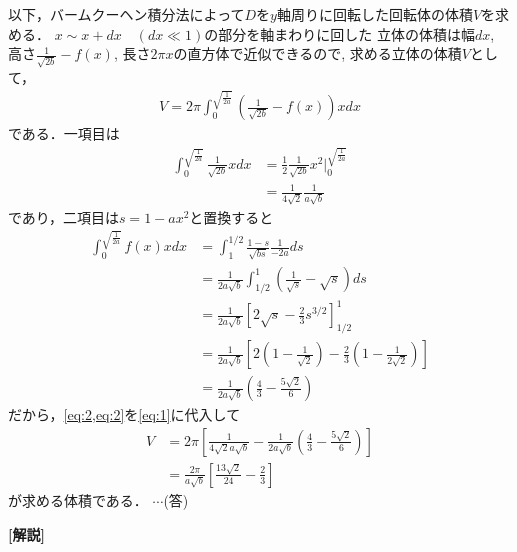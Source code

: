 \documentclass[a4paper,10pt]{ltjsarticle}
\begin{document}
\begin{multicols}{2}
  以下，バームクーヘン積分法によって$D$を$y$軸周りに回転した回転体の体積$V$を求める．
  $x \sim x+dx \quad (dx \ll 1)$の部分を軸まわりに回した
  立体の体積は幅$dx$, 高さ$\frac{1}{\sqrt{2b}}-f(x)$, 長さ$2\pi x$の直方体で近似できるので,
  求める立体の体積$V$として，
  \begin{align}
    V = 2\pi \int_{0}^{\sqrt{\frac{1}{2a}}} \left(\frac{1}{\sqrt{2b}} - f(x)\right)x dx \label{eq:1}
  \end{align}
  である．一項目は
  \begin{align}
    \int_{0}^{\sqrt{\frac{1}{2a}}} \frac{1}{\sqrt{2b}} x dx
     & = \frac{1}{2} \frac{1}{\sqrt{2b}} x^2 \Big|_{0}^{\sqrt{\frac{1}{2a}}} \nonumber \\
     & = \frac{1}{4\sqrt{2}} \frac{1}{a\sqrt{b}} \label{eq:2}
  \end{align}
  であり，二項目は$s=1-ax^2$と置換すると
  \begin{align}
    \int_{0}^{\sqrt{\frac{1}{2a}}} f(x)x dx
     & = \int_{1}^{1/2} \frac{1-s}{\sqrt{bs}} \frac{1}{-2a} ds                        \nonumber       \\
     & = \frac{1}{2a\sqrt{b}} \int_{1/2}^{1} \left(\frac{1}{\sqrt{s}} - \sqrt{s}\right) ds  \nonumber \\
     & = \frac{1}{2a\sqrt{b}} \left[2\sqrt{s} - \frac{2}{3} s^{3/2}\right]_{1/2}^{1}     \nonumber    \\
     & = \frac{1}{2a\sqrt{b}} \left[2\left(1-\frac{1}{\sqrt{2}}\right) -
    \frac{2}{3}\left(1-\frac{1}{2\sqrt{2}}\right)\right]                               \nonumber      \\
     & = \frac{1}{2a\sqrt{b}} \left(\frac{4}{3} - \frac{5\sqrt{2}}{6}\right) \label{eq:3}
  \end{align}
  だから，\cref{eq:2,eq:2}を\cref{eq:1}に代入して
  \begin{align*}
    V & = 2\pi \left[ \frac{1}{4\sqrt{2}a\sqrt{b}}  - \frac{1}{2a\sqrt{b}} \left(\frac{4}{3} - \frac{5\sqrt{2}}{6}\right) \right] \\
      & = \frac{2\pi}{a\sqrt{b}} \left[ \frac{13\sqrt{2}}{24} - \frac{2}{3} \right]
  \end{align*}
  が求める体積である．  $\cdots$(答)

  \vspace{10pt}
  {\bf[解説]}

  \newpage
\end{multicols}
\end{document}
